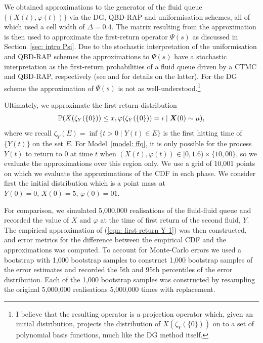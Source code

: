 We obtained approximations to the generator of the fluid queue \(\{(X(t),\varphi(t))\}\) via the DG, QBD-RAP and uniformisation schemes, all of which used a cell width of \(\Delta=0.4\). The matrix resulting from the approximation is then used to approximate the first-return operator \(\mathbb\Psi(s)\) as discussed in Section~\ref{sec: intro Psi}. Due to the stochastic interpretation of the uniformisation and QBD-RAP schemes the approximations to \(\mathbb \Psi(s)\) have a stochastic interpretation as the first-return probabilities of a fluid queue driven by a CTMC and QBD-RAP, respectively (see \cite[Chapter~7]{p2019} and \cite{bgnp2021} for details on the latter). For the DG scheme the approximation of \(\mathbb \Psi(s)\) is not as well-understood.\footnote{I believe that the resulting operator is a projection operator which, given an initial distribution, projects the distribution of \(X(\zeta_{Y}(\{0\}))\) on to a set of polynomial basis functions, much like the DG method itself.}

Ultimately, we approximate the first-return distribution 
\begin{align}\label{eqn: first return Y 1}
	\mathbb P(X(\zeta_{Y}(\{0\}))\leq x, \varphi(\zeta_{Y}(\{0\}))=i\mid \boldsymbol X(0)\sim \mu),
\end{align}
where we recall \(\zeta_{Y}(E) = \inf\{t>0\mid Y(t)\in E\}\) is the first hitting time of \(\{Y(t)\}\) on the set \(E\). For Model~\ref{model: ffq}, it is only possible for the process \(Y(t)\) to return to \(0\) at time \(t\) when \((X(t),\varphi(t))\in[0,1.6)\times \{10,00\}\), so we evaluate the approximations over this region only. We use a grid of 10,001 points on which we evaluate the approximations of the CDF in each phase. We consider first the initial distribution which is a point mass at \(Y(0)=0,\, X(0)=5,\, \varphi(0)=01\). 

For comparison, we simulated 5,000,000 realisations of the fluid-fluid queue and recorded the value of \(X\) and \(\varphi\) at the time of first return of the second fluid, \(Y\). The empirical approximation of (\ref{eqn: first return Y 1}) was then constructed, and error metrics for the difference between the empirical CDF and the approximations was computed. To account for Monte-Carlo errors we used a bootstrap with 1,000 bootstrap samples to construct 1,000 bootstrap samples of the error estimates and recorded the 5th and 95th percentiles of the error distribution. Each of the 1,000 bootstrap samples was constructed by resampling the original 5,000,000 realisations 5,000,000 times with replacement.

